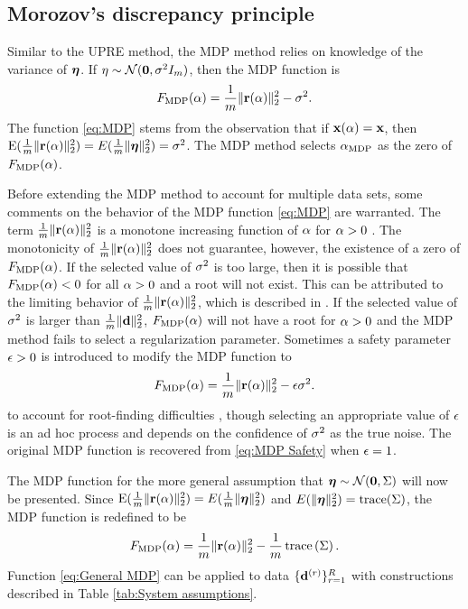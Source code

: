 \documentclass[12pt]{article}
\begin{document}
\subsection{Morozov's discrepancy principle} \label{sec:MDP}
Similar to the UPRE method, the MDP method relies on knowledge of the variance of $\bm{\eta}$. If $\eta \sim \mathcal{N}(\bm{0},\sigma^2 I_{m})$, then the MDP function is 
\begin{equation}
\label{eq:MDP}
F_{\text{MDP}}(\alpha) = \frac{1}{m}\|\mathbf{r}(\alpha)\|_2^2 - \sigma^2.
\end{equation}
The function \eqref{eq:MDP} stems from the observation that if $\mathbf{x}(\alpha) = \mathbf{x}$, then $\operatorname{E}(\frac{1}{m}\|\mathbf{r}(\alpha)\|_2^2) = E(\frac{1}{m}\|\bm{\eta}\|_2^2) = \sigma^2$. The MDP method selects $\alpha_{\text{MDP}}$ as the zero of $F_{\text{MDP}}(\alpha)$.  \par 
Before extending the MDP method to account for multiple data sets, some comments on the behavior of the MDP function \eqref{eq:MDP} are warranted. The term $\frac{1}{m}\|\mathbf{r}(\alpha)\|_2^2$ is a monotone increasing function of $\alpha$ for $\alpha > 0$ \cite{Vogel:2002}. The monotonicity of $\frac{1}{m}\|\mathbf{r}(\alpha)\|_2^2$ does not guarantee, however, the existence of a zero of $F_{\text{MDP}}(\alpha)$. If the selected value of $\sigma^2$ is too large, then it is possible that $F_{\text{MDP}}(\alpha) < 0$ for all $\alpha > 0$ and a root will not exist. This can be attributed to the limiting behavior of $\frac{1}{m}\|\mathbf{r}(\alpha)\|_2^2$, which is described in \cite{Byrne}. If the selected value of $\sigma^2$ is larger than $\frac{1}{m}\|\mathbf{d}\|_2^2$, $F_{\text{MDP}}(\alpha)$ will not have a root for $\alpha > 0$ and the MDP method fails to select a regularization parameter. Sometimes a safety parameter $\epsilon > 0$ is introduced to modify the MDP function to
\begin{equation}
\label{eq:MDP Safety}
F_{\text{MDP}}(\alpha) = \frac{1}{m}\|\mathbf{r}(\alpha)\|_2^2 - \epsilon\sigma^2.
\end{equation}
to account for root-finding difficulties \cite{ABT,IRTools}, though selecting an appropriate value of $\epsilon$ is an ad hoc process and depends on the confidence of $\sigma^2$ as the true noise. The original MDP function is recovered from \eqref{eq:MDP Safety} when $\epsilon = 1$. \par
The MDP function for the more general assumption that $\bm{\eta} \sim \mathcal{N}(\bm{0},\Sigma)$ will now be presented. Since $\operatorname{E}(\frac{1}{m}\|\mathbf{r}(\alpha)\|_2^2) = E(\frac{1}{m}\|\bm{\eta}\|_2^2)$ and $E(\|\bm{\eta}\|_2^2) = \operatorname{trace}(\Sigma)$, the MDP function is redefined to be
\begin{equation}
\label{eq:General MDP}
F_{\text{MDP}}(\alpha) = \frac{1}{m}\|\mathbf{r}(\alpha)\|_2^2 - \frac{1}{m}\operatorname{trace}\left(\Sigma\right).
\end{equation}
Function \eqref{eq:General MDP} can be applied to data $\{\mathbf{d}^{(r)}\}_{r=1}^R$ with constructions described in Table \ref{tab:System assumptions}. 
\end{document}
